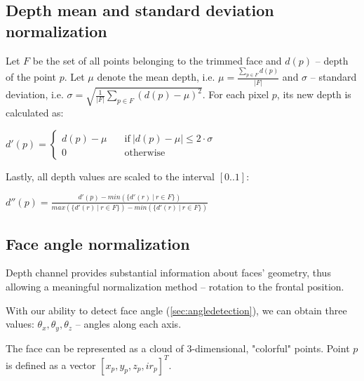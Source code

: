         \subsection*{Depth mean and standard deviation normalization}
        Let $F$ be the set of all points belonging to the trimmed face and
        $d(p)$ -- depth of the point $p$. Let $\mu$ denote the mean depth, i.e.
        $\mu = \frac{\sum\limits_{p \in F}{d(p)}}{|F|}$ and $\sigma$ -- standard
        deviation, i.e. $\sigma = \sqrt{\frac{1}{|F|} \sum\limits_{p \in F}{(d(p) - \mu)^2}}$.
        For each pixel $p$, its new depth is calculated as:

        \begin{center}
        $
          d'(p) = \begin{cases}
                  d(p) - \mu &\quad\text{if}\ |d(p) - \mu| \leqslant 2 \cdot \sigma \\
                  0 &\quad\text{otherwise}
                  \end{cases}
        $
        \end{center}


        Lastly, all depth values are scaled to the interval $[0..1]$:
        \begin{center}
        $
          d''(p) = \frac{d'(p) - min(\{d'(r)\ |\ r \in F\})}{max(\{d'(r)\ |\ r \in F\}) - min(\{d'(r)\ |\ r \in F\})}
        $
        \end{center}

        \subsection*{Face angle normalization}
        Depth channel provides substantial information about faces' geometry, thus allowing
        a meaningful normalization method -- rotation to the frontal position.

        With our ability to detect face angle (\ref{sec:angledetection}), we can obtain
        three values: $\theta_x, \theta_y, \theta_z$ -- angles along each axis.

        The face can be represented as a cloud of $3$-dimensional, "colorful" points.
        Point $p$ is defined as a vector $[x_p, y_p, z_p, ir_p]^{T}$.


